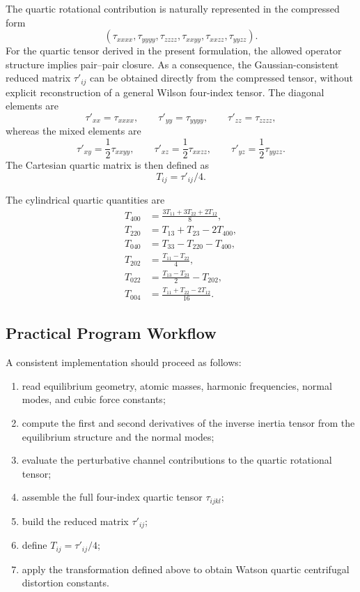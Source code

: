 \documentclass[aip,jcp,reprint]{revtex4-2}
\begin{document}
The quartic rotational contribution is naturally represented in the compressed form
\[
(\tau_{xxxx},\tau_{yyyy},\tau_{zzzz},\tau_{xxyy},\tau_{xxzz},\tau_{yyzz}).
\]
For the quartic tensor derived in the present formulation, the allowed operator
structure implies pair--pair closure. As a consequence, the Gaussian-consistent
reduced matrix $\tau'_{ij}$ can be obtained directly from the compressed tensor,
without explicit reconstruction of a general Wilson four-index tensor. The
diagonal elements are
\[
\tau'_{xx}=\tau_{xxxx},\qquad
\tau'_{yy}=\tau_{yyyy},\qquad
\tau'_{zz}=\tau_{zzzz},
\]
whereas the mixed elements are
\[
\tau'_{xy}=\frac{1}{2}\tau_{xxyy},\qquad
\tau'_{xz}=\frac{1}{2}\tau_{xxzz},\qquad
\tau'_{yz}=\frac{1}{2}\tau_{yyzz}.
\]
The Cartesian quartic matrix is then defined as
\[
T_{ij}=\tau'_{ij}/4.
\]

The cylindrical quartic quantities are
\begin{align}
T_{400} &= \frac{3T_{11}+3T_{22}+2T_{12}}{8},\\
T_{220} &= T_{13}+T_{23}-2T_{400},\\
T_{040} &= T_{33}-T_{220}-T_{400},\\
T_{202} &= \frac{T_{11}-T_{22}}{4},\\
T_{022} &= \frac{T_{13}-T_{23}}{2}-T_{202},\\
T_{004} &= \frac{T_{11}+T_{22}-2T_{12}}{16}.
\end{align}

\subsection{Practical Program Workflow}
A consistent implementation should proceed as follows:
\begin{enumerate}
\item read equilibrium geometry, atomic masses, harmonic frequencies, normal modes, and cubic force constants;
\item compute the first and second derivatives of the inverse inertia tensor from the equilibrium structure and the normal modes;
\item evaluate the perturbative channel contributions to the quartic rotational tensor;
\item assemble the full four-index quartic tensor $\tau_{ijkl}$;
\item build the reduced matrix $\tau'_{ij}$;
\item define $T_{ij}=\tau'_{ij}/4$;
\item apply the transformation defined above to obtain Watson quartic centrifugal distortion constants.
\end{enumerate}
\end{document}
